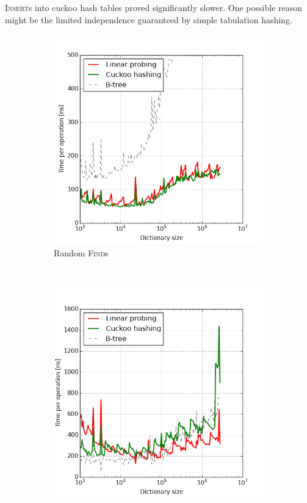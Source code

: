 \textsc{Insert}s into cuckoo hash tables proved significantly slower.
One possible reason might be the limited independence guaranteed by simple
tabulation hashing.

\begin{figure}
\begin{subfigure}[t]{0.45\textwidth}
	\includegraphics[width=\textwidth]{img/performance/hashing-1}
	\caption{Random \textsc{Find}s}
\end{subfigure}
~
\begin{subfigure}[t]{0.45\textwidth}
	\includegraphics[width=\textwidth]{img/performance/hashing-2}

\end{subfigure}
\end{figure}
